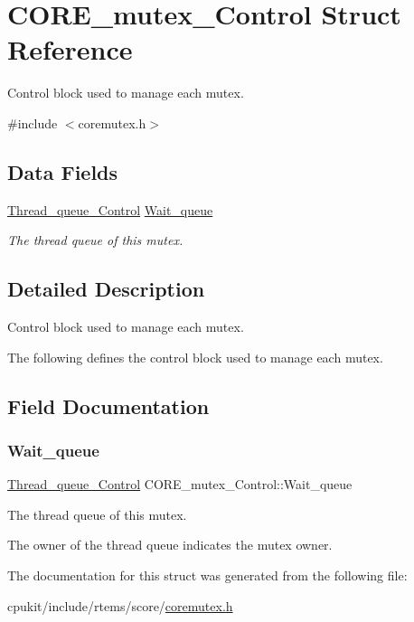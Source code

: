 \hypertarget{structCORE__mutex__Control}{}\section{C\+O\+R\+E\+\_\+mutex\+\_\+\+Control Struct Reference}
\label{structCORE__mutex__Control}


Control block used to manage each mutex.  




{\ttfamily \#include $<$coremutex.\+h$>$}

\subsection*{Data Fields}
\begin{DoxyCompactItemize}
\item 
\mbox{\hyperlink{structThread__queue__Control}{Thread\+\_\+queue\+\_\+\+Control}} \mbox{\hyperlink{structCORE__mutex__Control_aca1c9df718b27d75196f8ba33c2d0a54}{Wait\+\_\+queue}}
\begin{DoxyCompactList}\small\item\em The thread queue of this mutex. \end{DoxyCompactList}\end{DoxyCompactItemize}


\subsection{Detailed Description}
Control block used to manage each mutex. 

The following defines the control block used to manage each mutex. 

\subsection{Field Documentation}
\mbox{\label{structCORE__mutex__Control_aca1c9df718b27d75196f8ba33c2d0a54}} 
\subsubsection{\texorpdfstring{Wait\_queue}{Wait\_queue}}
{\footnotesize\ttfamily \mbox{\hyperlink{structThread__queue__Control}{Thread\+\_\+queue\+\_\+\+Control}} C\+O\+R\+E\+\_\+mutex\+\_\+\+Control\+::\+Wait\+\_\+queue}



The thread queue of this mutex. 

The owner of the thread queue indicates the mutex owner. 

The documentation for this struct was generated from the following file\+:\begin{DoxyCompactItemize}
\item 
cpukit/include/rtems/score/\mbox{\hyperlink{coremutex_8h}{coremutex.\+h}}\end{DoxyCompactItemize}
